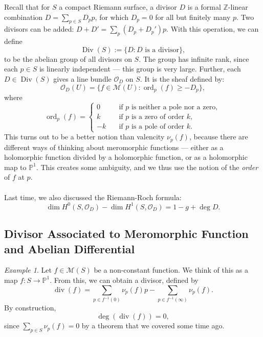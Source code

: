\documentclass[a4paper]{report}
\theoremstyle{definition}
\theoremstyle{remark}
\theoremstyle{proposition}
\theoremstyle{conjecture}
\theoremstyle{lemma}
\theoremstyle{corollary}
\theoremstyle{exercise}
\theoremstyle{example}
\newtheorem{example}{Example}
\newcommand{\mcal}{\mathcal}
\newcommand{\on}{\operatorname}
\begin{document}
Recall that for $S$ a compact Riemann surface, a divisor $D$ is a formal 
$\mathbb{Z}$-linear combination $D = \sum_{p\in S}D_pp$, for which 
$D_p=0$ for all but finitely many $p$.
Two divisors can be added: $D + D' = \sum_p(D_p+D_p')p$. 
With this operation, we can define 
$$\on{Div}(S) := \lbrace D : \text{$D$ is a divisor}\rbrace,$$
to be the abelian group of all divisors on $S$. The group has infinite
rank, since each $p\in S$ is linearly independent --- this group is very large.
Further, each $D \in \on{Div}(S)$ gives a line bundle $\mcal{O}_D$ on $S$.
It is the sheaf defined by:
$$\mcal{O}_D(U) = \lbrace f\in \mcal{M}(U) : \on{ord}_p(f) \geq -D_p\rbrace,$$
where 
$$\on{ord}_p(f) = \begin{cases}
    0 \quad &\text{if $p$ is neither a pole nor a zero},\\
    k \quad &\text{if $p$ is a zero of order $k$},\\
    -k \quad &\text{if $p$ is a pole of order $k$}.
\end{cases}$$
This turns out to be a better notion than valencity $\nu_p(f)$, because 
there are different ways of thinking about meromorphic functions --- either 
as a holomorphic function divided by a holomorphic function, or as a 
holomorphic map to $\mathbb{P}^1$. This creates some ambiguity, and we thus
use the notion of the \emph{order} of $f$ at $p$.\\\\
Last time, we also discussed the Riemann-Roch formula:
$$\dim H^0(S,\mcal{O}_D) - \dim H^1(S,\mcal{O}_D) = 1 - g + \deg D.$$

\subsection{Divisor Associated to Meromorphic Function and Abelian Differential}

\begin{example}
    Let $f \in \mcal{M}(S)$ be a non-constant function. We think of this as a 
    map $f : S \to \mathbb{P}^1$. From this, we can 
    obtain a divisor, defined by 
    $$\on{div}(f) = \sum_{p\in f^{-1}(0)} \nu_p(f)p - \sum_{p\in f^{-1}(\infty)}\nu_p(f).$$
    By construction,
    $$\deg (\on{div}(f)) = 0,$$
    since $\sum_{p\in S} \nu_p(f) = 0$ by a theorem that we covered some time 
    ago. 
\end{example}
\end{document}
